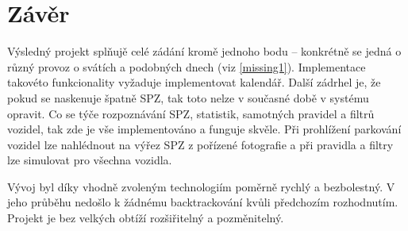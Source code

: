\chapter*{Závěr}

Výsledný projekt splňujě celé zádání kromě jednoho bodu -- konkrétně se jedná o
různý provoz
o svátích a podobných dnech (viz \ref{missing1}). Implementace takovéto funkcionality
vyžaduje implementovat kalendář.
Další zádrhel je, že pokud se naskenuje špatně SPZ, tak toto nelze v současné době
v systému opravit.
Co se týče rozpoznávání SPZ, statistik, samotných pravidel a filtrů vozidel,
tak zde je vše implementováno a funguje skvěle.
Při prohlížení parkování vozidel lze nahlédnout na výřez SPZ z pořízené fotografie a
při pravidla a filtry lze simulovat pro všechna vozidla.

Vývoj byl díky vhodně zvoleným technologiím poměrně rychlý a bezbolestný.
V jeho průběhu nedošlo k žádnému backtrackování kvůli předchozím rozhodnutím.
Projekt je bez velkých obtíží rozšiřitelný a pozměnitelný.
